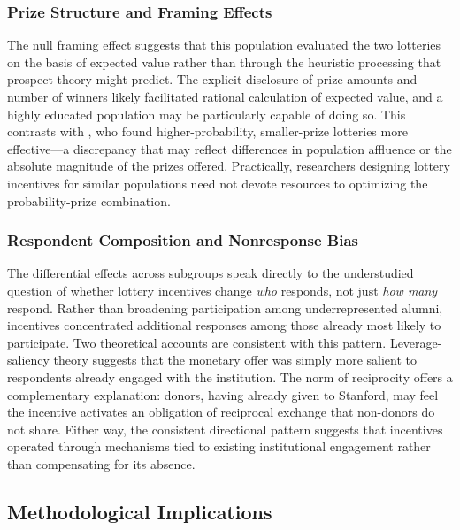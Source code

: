 \subsubsection{Prize Structure and Framing Effects}

The null framing effect suggests that this population evaluated the two lotteries on the
basis of expected value rather than through the heuristic processing that prospect theory
might predict. The explicit disclosure of prize amounts and number of winners likely
facilitated rational calculation of expected value, and a highly educated population may
be particularly capable of doing so. This contrasts with \textcite{Deutskens.etal2004}, who
found higher-probability, smaller-prize lotteries more effective---a discrepancy that may
reflect differences in population affluence or the absolute magnitude of the prizes
offered. Practically, researchers designing lottery incentives for similar populations
need not devote resources to optimizing the probability-prize combination.

\subsubsection{Respondent Composition and Nonresponse Bias}

The differential effects across subgroups speak directly to the understudied question of
whether lottery incentives change \emph{who} responds, not just \emph{how many} respond.
Rather than broadening participation among underrepresented alumni, incentives
concentrated additional responses among those already most likely to participate. Two
theoretical accounts are consistent with this pattern. Leverage-saliency theory
\parencite{Groves.etal2000a} suggests that the monetary offer was simply more salient to
respondents already engaged with the institution. The norm of reciprocity offers a
complementary explanation: donors, having already given to Stanford, may feel the
incentive activates an obligation of reciprocal exchange that non-donors do not share.
Either way, the consistent directional pattern suggests that incentives operated through
mechanisms tied to existing institutional engagement rather than compensating for its
absence.

\subsection{Methodological Implications}

